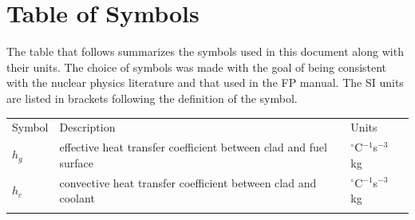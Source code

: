 \documentclass[preprint, 10pt]{sigplanconf}
\begin{document}
\section*{Table of Symbols}
\label{Sec:ToS}
The table that follows summarizes the symbols used in this document along with
their units. The choice of symbols was made with the goal of being consistent
with the nuclear physics literature and that used in the FP manual. The SI units
are listed in brackets following the definition of the symbol.
\begin{longtable}{l l p{8.5cm}}
Symbol & Description & Units\
\\
$h_{g}$ & effective heat transfer coefficient between clad
and fuel surface & ${}^{\circ}$C$^{-1}$s$^{-3}$kg\
\\
$h_{c}$ & convective heat transfer coefficient between clad
and coolant & ${}^{\circ}$C$^{-1}$s$^{-3}$kg\
\\
\label{Table:ToS}
\end{longtable}
\end{document}
